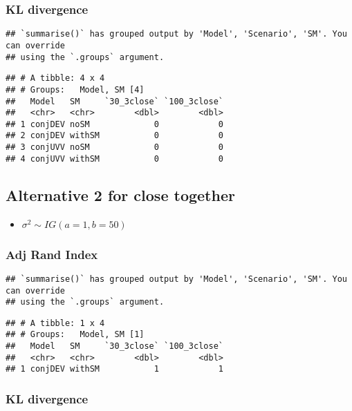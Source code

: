 \documentclass[
]{article}
\providecommand{\tightlist}{%
  \setlength{\itemsep}{0pt}\setlength{\parskip}{0pt}}
\begin{document}
\hypertarget{kl-divergence-1}{%
\subsubsection{KL divergence}\label{kl-divergence-1}}

\begin{verbatim}
## `summarise()` has grouped output by 'Model', 'Scenario', 'SM'. You can override
## using the `.groups` argument.
\end{verbatim}

\begin{verbatim}
## # A tibble: 4 x 4
## # Groups:   Model, SM [4]
##   Model   SM     `30_3close` `100_3close`
##   <chr>   <chr>        <dbl>        <dbl>
## 1 conjDEV noSM             0            0
## 2 conjDEV withSM           0            0
## 3 conjUVV noSM             0            0
## 4 conjUVV withSM           0            0
\end{verbatim}

\hypertarget{alternative-2-for-close-together}{%
\subsection{Alternative 2 for close
together}\label{alternative-2-for-close-together}}

\begin{itemize}
\tightlist
\item
  \(\sigma^2 \sim IG(a=1, b=50)\)
\end{itemize}

\hypertarget{adj-rand-index-2}{%
\subsubsection{Adj Rand Index}\label{adj-rand-index-2}}

\begin{verbatim}
## `summarise()` has grouped output by 'Model', 'Scenario', 'SM'. You can override
## using the `.groups` argument.
\end{verbatim}

\begin{verbatim}
## # A tibble: 1 x 4
## # Groups:   Model, SM [1]
##   Model   SM     `30_3close` `100_3close`
##   <chr>   <chr>        <dbl>        <dbl>
## 1 conjDEV withSM           1            1
\end{verbatim}

\hypertarget{kl-divergence-2}{%
\subsubsection{KL divergence}\label{kl-divergence-2}}
\end{document}
